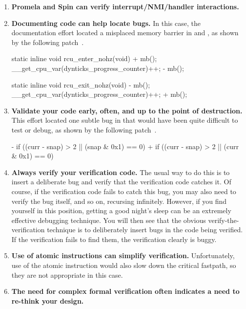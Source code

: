 \begin{enumerate}
\item	{\bf Promela and Spin can verify interrupt\slash NMI\-/handler
	interactions.}
\item	{\bf Documenting code can help locate bugs.}
	In this case, the documentation effort located
	a misplaced memory barrier in
	 and ,
	as shown by the following patch~\cite{PaulEMcKenney2008commit:ae66be9b71b1}.

\begin{VerbatimU}
 static inline void rcu_enter_nohz(void)
 {
+       mb();
        __get_cpu_var(dynticks_progress_counter)++;
-       mb();
 }

 static inline void rcu_exit_nohz(void)
 {
-       mb();
        __get_cpu_var(dynticks_progress_counter)++;
+       mb();
 }
\end{VerbatimU}

\item	{\bf Validate your code early, often, and up to the point
	of destruction.}
	This effort located one subtle bug in
	that would have been quite difficult to test or debug, as
	shown by the following patch~\cite{PaulEMcKenney2008commit:d7c0651390b6}.

\begin{VerbatimU}
-       if ((curr - snap) > 2 || (snap & 0x1) == 0)
+       if ((curr - snap) > 2 || (curr & 0x1) == 0)
\end{VerbatimU}

\item	{\bf Always verify your verification code.}
	The usual way to do this is to insert a deliberate bug
	and verify that the verification code catches it.
	Of course, if the verification code fails to catch this bug,
	you may also need to verify the bug itself, and so on,
	recursing infinitely.
	However, if you find yourself in this position,
	getting a good night's sleep
	can be an extremely effective debugging technique.
	You will then see that the obvious verify-the-verification
	technique is to deliberately insert bugs in the code being
	verified.
	If the verification fails to find them, the verification clearly
	is buggy.
\item	{\bf Use of atomic instructions can simplify verification.}
	Unfortunately, use of the  atomic instruction
	would also slow down the critical  fastpath, so they
	are not appropriate in this case.
\item	{\bf The need for complex formal verification often indicates
	a need to re-think your design.}
\end{enumerate}

